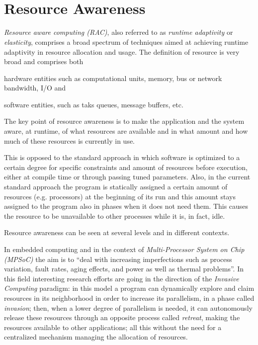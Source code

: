 
~\\~
\section{Resource Awareness} \label{sec:resourceAwareness}

\emph{Resource aware computing (RAC)}, also referred to as \emph{runtime adaptivity} or \emph{elasticity}, comprises a broad spectrum of techniques aimed at achieving runtime adaptivity in resource allocation and usage. The definition of resource is very broad and comprises both 
\begin{enumerate*}[label={(\roman*)}]
	\item hardware entities such as computational units, memory, bus or network bandwidth, I/O and
	\item software entities, such as taks queues, message buffers, etc.
\end{enumerate*}

The key point of resource awareness is to make the application and the system aware, at runtime, of what resources are available and in what amount and how much of these resources is currently in use.

This is opposed to the standard approach in which software is optimized to a certain degree for specific constraints and amount of resources before execution, either at compile time or through passing tuned parameters.
Also, in the current standard approach the program is statically assigned a certain amount of resources (e.g. processors) at the beginning of its run and this amount stays assigned to the program also in phases when it does not need them. This causes the resource to be unavailable to other processes while it is, in fact, idle.

Resource awareness can be seen at several levels and in different contexts.

In embedded computing and in the context of \emph{Multi-Processor System on Chip (MPSoC)} the aim is to ``deal with increasing imperfections such as process variation, fault rates, aging effects, and power as well as thermal problems''\cite{hannig2011resource}. In this field interesting research efforts are going in the direction of the \emph{Invasive Computing}\cite{teich2011invasive} paradigm: in this model a program can dynamically explore and claim resources in its neighborhood in order to increase its parallelism, in a phase called \emph{invasion}; then, when a lower degree of parallelism is needed, it can autonomously release these resources through an opposite process called \emph{retreat}, making the resources available to other applications; all this without the need for a centralized mechanism managing the allocation of resources.

